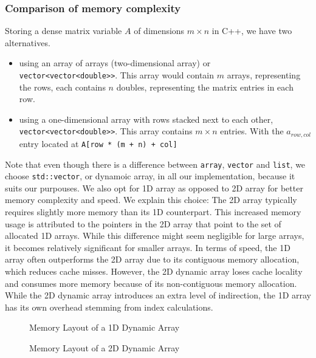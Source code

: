 \subsubsection{Comparison of memory complexity}
Storing a dense matrix variable \( A \) of dimensions \( m \times n \) in C++, we have two alternatives.
\begin{itemize}
    \item using an array of arrays (two-dimensional array) or \texttt{vector<vector<double>>}. This array would contain
          $m$ arrays, representing the rows, each contains $n$ doubles, representing the matrix entries in each row.
    \item using a one-dimensional array with rows stacked next to each other, \texttt{vector<vector<double>>}. This
          array contains $m \times n$ entries. With the $a_{row,col}$ entry located at \texttt{A[row * (m + n) + col]}
\end{itemize}
Note that even
though there is a difference between  \texttt{array}, \texttt{vector} and \texttt{list}, we
choose \texttt{std::vector}, or dynamoic array, in all our implementation, because it suits our purpouses.
We also opt for 1D array as opposed to 2D array for better memory complexity and speed.
We explain this choice:
The 2D array typically requires slightly more memory than its 1D counterpart.
This increased memory usage is attributed to the pointers in the 2D array that point to
the set of allocated 1D arrays. While this difference might seem negligible for large arrays,
it becomes relatively significant for smaller arrays. In terms of speed, the 1D array often outperforms
the 2D array due to its contiguous memory allocation, which reduces cache misses.
However, the 2D dynamic array loses cache locality and consumes more memory because of its non-contiguous
memory allocation. While the 2D dynamic array introduces an
extra level of indirection, the 1D array has its own overhead stemming from index calculations.

\begin{figure}[h]
    \centering
    \caption{Memory Layout of a 1D Dynamic Array}
\end{figure}

\begin{figure}[h]
    \centering
    \caption{Memory Layout of a 2D Dynamic Array}
\end{figure}



